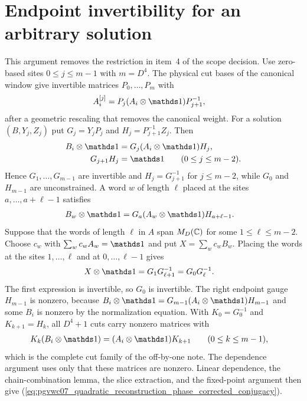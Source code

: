 \documentclass{article}
\begin{document}
\section{Endpoint invertibility for an arbitrary solution}
\label{sec:pgvwc07_quadratic_reconstruction_phase_endpoints}

This argument removes the restriction in item~4 of the scope decision. Use
zero-based sites $0\leq j\leq m-1$ with $m=D^4$. The physical
cut bases of the canonical window give invertible matrices
$P_0,\ldots,P_m$ with
\begin{align}
    A_i^{[j]}
     & =P_j(A_i\otimes\Id)P_{j+1}^{-1},
    \label{eq:pgvwc07_quadratic_reconstruction_phase_window_gauges}
\end{align}
after a geometric rescaling that removes the canonical weight. For a solution
$(B,Y_j,Z_j)$ put $G_j=Y_jP_j$ and $H_j=P_{j+1}^{-1}Z_j$. Then
\begin{align}
    B_i\otimes\Id
     & =G_j(A_i\otimes\Id)H_j,
    \label{eq:pgvwc07_quadratic_reconstruction_phase_gauged_system} \\
    G_{j+1}H_j
     & =\Id
    \qquad(0\leq j\leq m-2).
    \label{eq:pgvwc07_quadratic_reconstruction_phase_gauged_inverse}
\end{align}
Hence $G_1,\ldots,G_{m-1}$ are invertible and $H_j=G_{j+1}^{-1}$ for
$j\leq m-2$, while $G_0$ and $H_{m-1}$ are unconstrained. A word $w$ of length
$\ell$ placed at the sites $a,\ldots,a+\ell-1$ satisfies
\begin{align}
    B_w\otimes\Id
     & =G_a(A_w\otimes\Id)H_{a+\ell-1}.
    \label{eq:pgvwc07_quadratic_reconstruction_phase_gauged_words}
\end{align}
Suppose that the words of length $\ell$ in $A$ span $M_D(\mathbb{C})$ for some
$1\leq\ell\leq m-2$. Choose $c_w$ with $\sum_wc_wA_w=\Id$ and put
$X=\sum_wc_wB_w$. Placing the words at the sites $1,\ldots,\ell$ and at
$0,\ldots,\ell-1$ gives
\begin{align}
    X\otimes\Id
     & =G_1G_{\ell+1}^{-1}
    =G_0G_\ell^{-1}.
    \label{eq:pgvwc07_quadratic_reconstruction_phase_endpoint_identity}
\end{align}
The first expression is invertible, so $G_0$ is invertible. The right endpoint
gauge $H_{m-1}$ is nonzero, because $B_i\otimes\Id=G_{m-1}(A_i\otimes\Id)H_{m-1}$
and some $B_i$ is nonzero by the normalization equation. With $K_0=G_0^{-1}$
and $K_{k+1}=H_k$, all $D^4+1$ cuts carry nonzero matrices with
\begin{align}
    K_k(B_i\otimes\Id)
     & =(A_i\otimes\Id)K_{k+1}
    \qquad(0\leq k\leq m-1),
    \label{eq:pgvwc07_quadratic_reconstruction_phase_full_chain}
\end{align}
which is the complete cut family of the off-by-one note. The dependence
argument uses only that these matrices are nonzero. Linear dependence, the
chain-combination lemma, the slice extraction, and the fixed-point argument
then give (\ref{eq:pgvwc07_quadratic_reconstruction_phase_corrected_conjugacy}).
\end{document}
